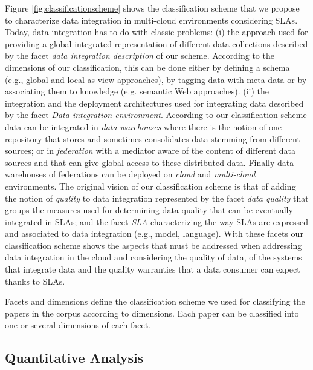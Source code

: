 Figure \ref{fig:classificationscheme} shows the classification scheme that we propose to characterize data integration in multi-cloud environments considering SLAs. Today, data integration has to do with  classic problems: (i) the approach used for providing a global integrated representation of different data collections described by the facet {\em data integration description} of our scheme. According to the dimensions of our classification, this can be done either by defining a schema (e.g., global and local as view approaches), by tagging data with meta-data or by associating them to knowledge (e.g. semantic Web approaches). (ii) the integration and the deployment architectures used for integrating data described by the facet {\em Data integration environment}. According to our classification scheme data can be integrated in {\em data warehouses} where there is the notion of one repository that stores and sometimes consolidates data stemming from different sources; or in {\em federation} with a mediator aware of the content of different data sources and that can give global access to these distributed data. Finally data warehouses of federations can be deployed on {\em cloud} and {\em multi-cloud} environments. The original vision of our classification scheme is that of adding the notion of {\em quality} to data integration represented by the facet {\em data quality} that groups the measures used for determining data quality that can be eventually integrated in SLAs; and  the facet {\em SLA}  characterizing the way SLAs are expressed and associated to data integration (e.g., model, language). With these facets our classification scheme shows the aspects that must be addressed when addressing data integration in the cloud and considering the quality of data, of the systems that integrate data and the quality warranties that a data consumer can expect thanks to SLAs.

Facets and dimensions define the classification scheme we used for  classifying the papers in the corpus according to dimensions. 
Each paper can be classified into one or several dimensions of each facet.

\subsection{Quantitative Analysis}\label{sec:qanalysis}

